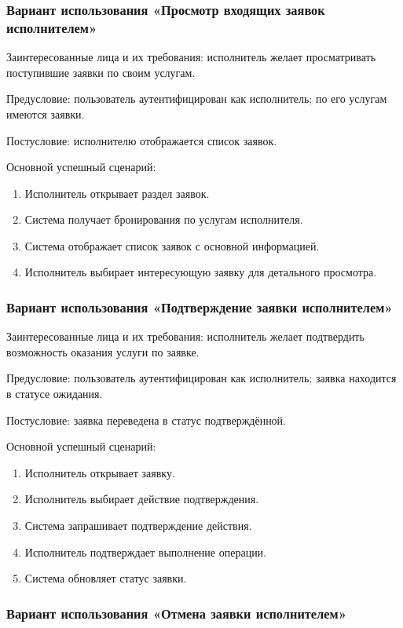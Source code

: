 \subsubsection{Вариант использования «Просмотр входящих заявок исполнителем»}

Заинтересованные лица и их требования: исполнитель желает просматривать поступившие заявки по своим услугам.

Предусловие: пользователь аутентифицирован как исполнитель; по его услугам имеются заявки.

Постусловие: исполнителю отображается список заявок.

Основной успешный сценарий:
\begin{enumerate}
	\item Исполнитель открывает раздел заявок.
	\item Система получает бронирования по услугам исполнителя.
	\item Система отображает список заявок с основной информацией.
	\item Исполнитель выбирает интересующую заявку для детального просмотра.
\end{enumerate}

\subsubsection{Вариант использования «Подтверждение заявки исполнителем»}

Заинтересованные лица и их требования: исполнитель желает подтвердить возможность оказания услуги по заявке.

Предусловие: пользователь аутентифицирован как исполнитель; заявка находится в статусе ожидания.

Постусловие: заявка переведена в статус подтверждённой.

Основной успешный сценарий:
\begin{enumerate}
	\item Исполнитель открывает заявку.
	\item Исполнитель выбирает действие подтверждения.
	\item Система запрашивает подтверждение действия.
	\item Исполнитель подтверждает выполнение операции.
	\item Система обновляет статус заявки.
\end{enumerate}

\subsubsection{Вариант использования «Отмена заявки исполнителем»}

